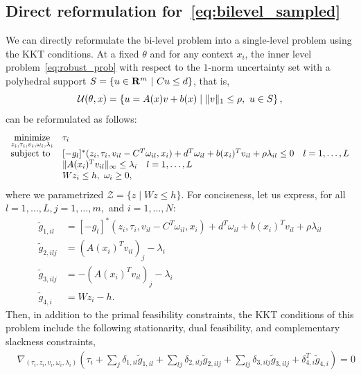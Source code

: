 \documentclass[11pt]{article}
\begin{document}
\begin{appendices}
\section{Direct reformulation for~\eqref{eq:bilevel_sampled}}
\label{appx:bilinear}
We can directly reformulate the bi-level problem into a single-level problem using the KKT conditions. 
At a fixed $\theta$ and for any context $x_i$, the inner level problem~\eqref{eq:robust_prob} with respect to the $1$-norm uncertainty set with a polyhedral support $S=\{u \in {\mathbf R}^m~|~Cu \leq d \}$, that is, 
\begin{equation*}
\label{unc_set}
    {\mathcal{U}}(\theta,x) = \left\{u = A(x)v+b(x) \mid \|v\|_1 \leq \rho ,~ u \in S\right\},
\end{equation*} 
can be reformulated as follows:
\begin{equation*}
	\label{eq:single}
  \begin{array}[t]{ll}
		\underset{z_i,\tau_i,v_i,\omega_i,\lambda_i}{\mbox{minimize}} & \tau_i \\
		\mbox{subject to} &[-g_l]^*(z_i,\tau_i,v_{il}-C^T\omega_{il},x_i) + 
        d^T\omega_{il} + b(x_i)^Tv_{il} + \rho\lambda_{il} \leq 0 \quad l = 1,\dots,L \\
         & \|A(x_i)^Tv_{il}\|_\infty \leq \lambda_{i} \quad l = 1,\dots,L\\
        & Wz_i \leq h,~\omega_i \geq 0,\\
	\end{array}
\end{equation*}
where we parametrized $\mathcal{Z} = \{z\mid Wz\leq h\}$. For conciseness, let us express, for all $l=1,\dots,L, j=1,\dots,m,$ and $i=1,\dots,N$:
\begin{align*}
    \tilde{g}_{1,il} &= [-g_l]^*(z_i,\tau_i,v_{il}-C^T\omega_{il},x_i) + 
        d^T\omega_{il} + b(x_i)^Tv_{il} + \rho\lambda_{il} \\
        \tilde{g}_{2,ilj} &= (A(x_i)^Tv_{il})_j - \lambda_i\\
        \tilde{g}_{3,ilj} &= -(A(x_i)^Tv_{il})_j - \lambda_i\\
        \tilde{g}_{4,i} &= Wz_i - h.
\end{align*}
Then, in addition to the primal feasibility constraints, the KKT conditions of this problem include the following stationarity, dual feasibility, and complementary slackness constraints,
\begin{equation}
	\label{eq:KKT}
	\tag{KKT}
\begin{aligned}
&\nabla_{(\tau_i,z_i,v_i,\omega_i,\lambda_i)} \left(\tau_i + \sum_{j}\delta_{1,il}\tilde{g}_{1,il} + \sum_{lj}\delta_{2,ilj}\tilde{g}_{2,ilj}+ \sum_{lj}\delta_{3,ilj}\tilde{g}_{3,ilj} + \delta_{4,i}^T\tilde{g}_{4,i}\right) = 0\\

\end{aligned}
\end{equation}
\end{appendices}
\end{document}
